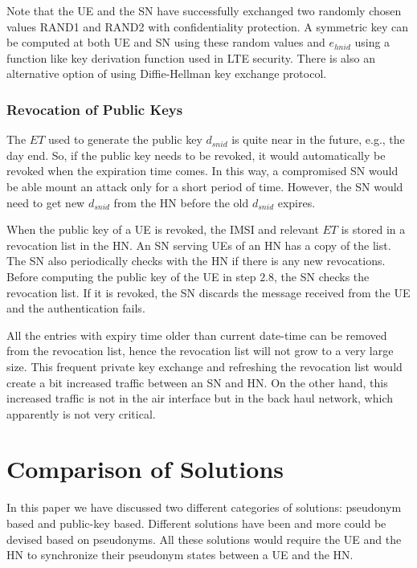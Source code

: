 \documentclass{river-journal}
\begin{document}
Note that the UE and the SN have successfully exchanged two randomly chosen values RAND1 and RAND2 with confidentiality protection. A symmetric key can be computed at both UE and SN using these random values and $e_{hnid}$ using a function like key derivation function used in LTE security. There is also an alternative option of using Diffie-Hellman key exchange protocol. 

\subsubsection{Revocation of Public Keys}
The $ET$ used to generate the public key $d_{snid}$ is quite near in the future, e.g., the day end. So, if the public key needs to be revoked, it would automatically be revoked when the expiration time comes. In this way, a compromised SN would be able mount an attack only for a short period of time. However, the SN would need to get new $d_{snid}$ from the HN before the old $d_{snid}$ expires. 

When the public key of a UE is revoked, the IMSI and relevant $ET$ is stored in a revocation list in the HN.  An SN serving UEs of an HN has a copy of the list. The SN also periodically checks with the HN if there is any new revocations. Before computing the public key of the UE in step $2.8$, the SN checks the revocation list. If it is revoked, the SN discards the message received from the UE and the authentication fails. 

All the entries with expiry time older than current date-time can be removed from the revocation list, hence the revocation list will not grow to a very large size. This frequent private key exchange and refreshing the revocation list would create a bit increased traffic between an SN and HN. On the other hand, this increased traffic is not in the air interface but in the back haul network, which apparently is not very critical. 


\section{Comparison of Solutions}
\label{sec:evaluation}
In this paper we have discussed two different categories of solutions: pseudonym based and public-key based. Different solutions \cite{pseudonym_valtteri_philip,pseudonym_ericsson,CCS15,SSR15} have been and more could be devised based on pseudonyms. All these solutions would require the UE and the HN to synchronize their pseudonym states between a UE and the HN.
\end{document}
